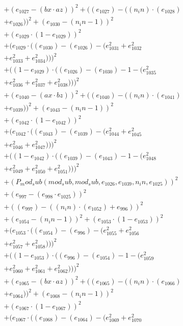 \documentclass[10pt, a4paper]{article}
\begin{document}
\begin{align*}
& + (e_{1027} - (bx  \cdot  az))^{2} + ((e_{1027}) - ((n_in)  \cdot  (e_{1028}) \\
& + e_{1026}))^{2} + (e_{1030} - (n_in - 1))^{2} \\
& + (e_{1029}  \cdot  (1 - e_{1029}))^{2} \\
& + (e_{1029}  \cdot  ((e_{1030}) - (e_{1026}) - (e_{1031}^{2} + e_{1032}^{2} \\
& + e_{1033}^{2} + e_{1034}^{2})))^{2} \\
& + ((1 - e_{1029})  \cdot  ((e_{1026}) - (e_{1030}) - 1 - (e_{1035}^{2} \\
& + e_{1036}^{2} + e_{1037}^{2} + e_{1038}^{2})))^{2} \\
& + (e_{1040} - (ax  \cdot  bz))^{2} + ((e_{1040}) - ((n_in)  \cdot  (e_{1041}) \\
& + e_{1039}))^{2} + (e_{1043} - (n_in - 1))^{2} \\
& + (e_{1042}  \cdot  (1 - e_{1042}))^{2} \\
& + (e_{1042}  \cdot  ((e_{1043}) - (e_{1039}) - (e_{1044}^{2} + e_{1045}^{2} \\
& + e_{1046}^{2} + e_{1047}^{2})))^{2} \\
& + ((1 - e_{1042})  \cdot  ((e_{1039}) - (e_{1043}) - 1 - (e_{1048}^{2} \\
& + e_{1049}^{2} + e_{1050}^{2} + e_{1051}^{2})))^{2} \\
& + (P_mod_sub(mod_sub, mod_sub, e_{1026}, e_{1039}, n_in, e_{1025}))^{2} \\
& + (e_{997} - (e_{998}  \cdot  e_{1025}))^{2} \\
& + ((e_{997}) - ((n_in)  \cdot  (e_{1052}) + e_{996}))^{2} \\
& + (e_{1054} - (n_in - 1))^{2} + (e_{1053}  \cdot  (1 - e_{1053}))^{2} \\
& + (e_{1053}  \cdot  ((e_{1054}) - (e_{996}) - (e_{1055}^{2} + e_{1056}^{2} \\
& + e_{1057}^{2} + e_{1058}^{2})))^{2} \\
& + ((1 - e_{1053})  \cdot  ((e_{996}) - (e_{1054}) - 1 - (e_{1059}^{2} \\
& + e_{1060}^{2} + e_{1061}^{2} + e_{1062}^{2})))^{2} \\
& + (e_{1065} - (bx  \cdot  az))^{2} + ((e_{1065}) - ((n_in)  \cdot  (e_{1066}) \\
& + e_{1064}))^{2} + (e_{1068} - (n_in - 1))^{2} \\
& + (e_{1067}  \cdot  (1 - e_{1067}))^{2} \\
& + (e_{1067}  \cdot  ((e_{1068}) - (e_{1064}) - (e_{1069}^{2} + e_{1070}^{2} \\

\end{align*}
\end{document}
